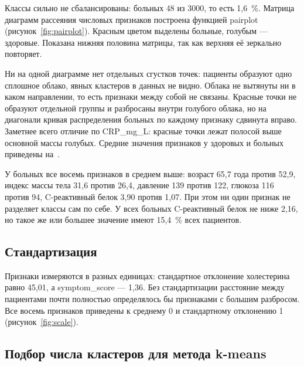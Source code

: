 \documentclass[a4paper,14pt]{extarticle}
\begin{document}

Классы сильно не сбалансированы: больных 48 из 3000, то есть 1,6~\%. Матрица диаграмм рассеяния числовых признаков построена функцией pairplot (рисунок~\ref{fig:pairplot}). Красным цветом выделены больные, голубым — здоровые. Показана нижняя половина матрицы, так как верхняя её зеркально повторяет.


Ни на одной диаграмме нет отдельных сгустков точек: пациенты образуют одно сплошное облако, явных кластеров в данных не видно. Облака не вытянуты ни в каком направлении, то есть признаки между собой не связаны. Красные точки не образуют отдельной группы и разбросаны внутри голубого облака, но на диагонали кривая распределения больных по каждому признаку сдвинута вправо. Заметнее всего отличие по CRP\_mg\_L: красные точки лежат полосой выше основной массы голубых. Средние значения признаков у здоровых и больных приведены на~.


У больных все восемь признаков в среднем выше: возраст 65,7 года против 52,9, индекс массы тела 31,6 против 26,4, давление 139 против 122, глюкоза 116 против 94, C-реактивный белок 3,90 против 1,07. При этом ни один признак не разделяет классы сам по себе. У всех больных C-реактивный белок не ниже 2,16, но такое же или большее значение имеют 15,4~\% всех пациентов.

\subsection{Стандартизация}

Признаки измеряются в разных единицах: стандартное отклонение холестерина равно 45,01, а symptom\_score — 1,36. Без стандартизации расстояние между пациентами почти полностью определялось бы признаками с большим разбросом. Все восемь признаков приведены к среднему 0 и стандартному отклонению 1 (рисунок~\ref{fig:scale}).


\subsection{Подбор числа кластеров для метода k-means}
\end{document}
